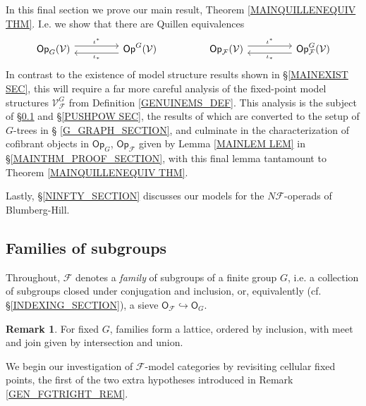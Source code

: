 \documentclass[a4paper,10pt
,draft
]{article}%
\numberwithin{equation}{section}
\numberwithin{figure}{section}
\theoremstyle{definition} %
\newtheorem{remark}[equation]{Remark}%
\newcommand{\F}{\ensuremath{\mathcal F}}
\newcommand{\1}{\ensuremath{\mathbbm 1}}%
\begin{document}
In this final section we prove our main result, Theorem \ref{MAINQUILLENEQUIV THM}. I.e. we show 
that there are Quillen equivalences
\[
\begin{tikzcd}[column sep =4.5em]
	\mathsf{Op}_{G}(\mathcal{V}) 
	\arrow[r, shift left=1.5,swap,"\iota^{\**}"']
&
	\mathsf{Op}^G(\mathcal{V})
	\ar[shift left=1.5]{l}{\iota_{\**}}
&
	\mathsf{Op}_{\mathcal{F}}(\mathcal{V}) 
	\arrow[r, shift left=1.5,swap,"\iota^{\**}"']
&
	\mathsf{Op}^G_{\mathcal{F}}(\mathcal{V})
	\ar[shift left=1.5]{l}{\iota_{\**}}
\end{tikzcd}
\]
In contrast to the existence of model structure results shown in \S \ref{MAINEXIST SEC},
this will require a far more careful analysis of the  
fixed-point model structures
$\mathcal{V}^G_{\mathcal{F}}$
from Definition \ref{GENUINEMS_DEF}.
This analysis is the subject of \S \ref{FAMILY_SEC} and \S \ref{PUSHPOW SEC}, the results of which are converted 
to the setup of $G$-trees in \S
\ref{G_GRAPH_SECTION},
and culminate in 
the characterization of cofibrant objects in
$\mathsf{Op}_{G}$,
$\mathsf{Op}_{\mathcal{F}}$ given by
Lemma \ref{MAINLEM LEM}
in \S \ref{MAINTHM_PROOF_SECTION},
with this final lemma tantamount to 
Theorem \ref{MAINQUILLENEQUIV THM}.

Lastly, \S \ref{NINFTY_SECTION} discusses our models for the 
$N \mathcal{F}$-operads of Blumberg-Hill.

\subsection{Families of subgroups}
\label{FAMILY_SEC}

Throughout,
$\mathcal{F}$ denotes a \textit{family} of subgroups of a finite group $G$,
i.e. a collection of subgroups closed under conjugation and inclusion, or, equivalently
(cf. \S \ref{INDEXING_SECTION}),
a sieve 
$
\mathsf{O}_{\mathcal{F}}
	\hookrightarrow 
\mathsf{O}_G
$.

\begin{remark}
For fixed $G$, families form a lattice, ordered by inclusion, 
with meet and join given by intersection and union.
\end{remark}

We begin our investigation of $\F$-model categories
by revisiting cellular fixed points,
the first of the two extra hypotheses introduced in Remark \ref{GEN_FGTRIGHT_REM}.
\end{document}
